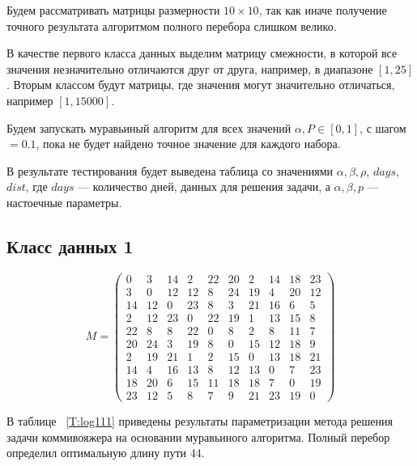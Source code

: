 \documentclass[12pt]{report}
\begin{document}
Будем рассматривать матрицы размерности $10\times10$, так как иначе получение точного результата алгоритмом полного перебора слишком велико.

В качестве первого класса данных выделим матрицу смежности, в которой все значения незначительно отличаются друг от друга, например, в диапазоне $[1, 25]$.
Вторым классом будут матрицы, где значения могут значительно отличаться, например $[1, 15000]$.

Будем запускать муравьиный алгоритм для всех значений $\alpha, P\in[0, 1]$, с шагом $= 0.1$, пока не будет найдено точное значение для каждого набора.

В результате тестирования будет выведена таблица со значениями $\alpha, \beta, \rho$, $days$, $ dist$, где $days$ — количество дней, данных для решения задачи, а $\alpha, \beta, p$ — настоечные параметры.

\subsection{Класс данных 1}
\begin{equation}
\label{matrix}
	M = \begin{pmatrix}
		0 &  3 & 14 &  2 & 22 & 20 &  2 & 14 & 18 & 23\\
		3 &  0 & 12 & 12 &  8 & 24 & 19 &  4 & 20 & 12\\
		14 & 12 & 0 & 23 &  8 &  3 & 21 & 16 &  6 &  5\\
		2 & 12 & 23 &  0 & 22 & 19 &  1 & 13 & 15  & 8\\
		22 &  8 &  8 & 22 &  0 &  8 &  2  & 8 & 11 &  7\\
		20 & 24 &  3 & 19 &  8  & 0 & 15 & 12 & 18  & 9\\
		2 & 19 & 21  & 1 &  2 & 15  & 0 & 13 & 18 & 21\\
		14 &  4 & 16 & 13 &  8 & 12 & 13 &  0 &  7 & 23\\
		18 & 20 &  6 & 15 & 11 & 18 & 18 &  7 &  0 & 19\\
		23 & 12 &  5  & 8 &  7 &  9 & 21 & 23 & 19 &  0
	\end{pmatrix}
\end{equation}

В таблице ~\ref{T:log111} приведены результаты параметризации метода решения задачи коммивояжера на основании муравьиного алгоритма. Полный перебор определил оптимальную длину пути 44.
\end{document}
